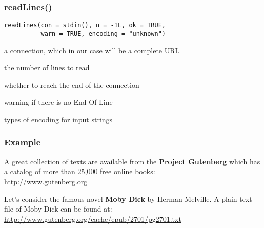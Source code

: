 \documentclass[12pt]{beamer}\usepackage[]{graphicx}\usepackage[]{color}
\begin{document}

\begin{frame}[fragile]
\frametitle{readLines()}

 \begin{verbatim}
readLines(con = stdin(), n = -1L, ok = TRUE, 
          warn = TRUE, encoding = "unknown")
 \end{verbatim}
\eb

\bi
 \item {} a connection, which in our case will be a complete URL
 \item {} the number of lines to read
 \item {} whether to reach the end of the connection
 \item {} warning if there is no End-Of-Line
 \item {} types of encoding for input strings
\ei

\end{frame}


\begin{frame}[fragile]
\frametitle{Example}

A great collection of texts are available from the \textbf{Project Gutenberg} which has a catalog of more than 25,000 free online books: \\
{ \footnotesize \url{http://www.gutenberg.org}}
\eb

Let's consider the famous novel \textbf{Moby Dick} by Herman Melville. 
A plain text file of Moby Dick can be found at: \\
{ \footnotesize \url{http://www.gutenberg.org/cache/epub/2701/pg2701.txt}}
\eb

\end{frame}

\end{document}
